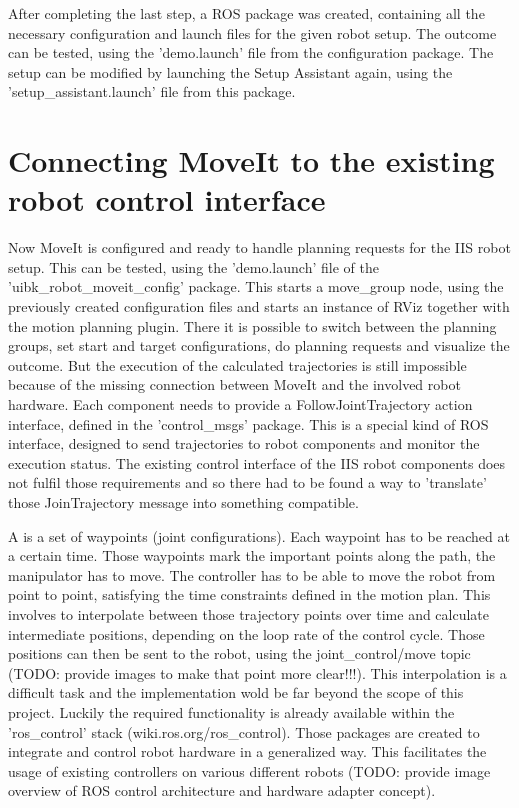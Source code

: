 After completing the last step, a ROS package was created, containing all the necessary configuration and launch files for the given robot setup. The outcome can be tested, using the 'demo.launch' file from the configuration package. The setup can be modified by launching the Setup Assistant again, using the 'setup\_assistant.launch' file from this package.


\section{Connecting MoveIt to the existing robot control interface}

Now MoveIt is configured and ready to handle planning requests for the IIS robot setup. This can be tested, using the 'demo.launch' file of the 'uibk\_robot\_moveit\_config' package. This starts a move\_group node, using the previously created configuration files and starts an instance of RViz together with the motion planning plugin. There it is possible to switch between the planning groups, set start and target configurations, do planning requests and visualize the outcome. But the execution of the calculated trajectories is still impossible because of the missing connection between MoveIt and the involved robot hardware. Each component needs to provide a FollowJointTrajectory action interface, defined in the 'control\_msgs' package. This is a special kind of ROS interface, designed to send trajectories to robot components and monitor the execution status. The existing control interface of the IIS robot components does not fulfil those requirements and so there had to be found a way to 'translate' those JoinTrajectory message into something compatible.

A is a set of waypoints (joint configurations). Each waypoint has to be reached at a certain time.
Those waypoints mark the important points along the path, the manipulator has to move. The controller has to be able to move the robot from point to point, satisfying the time constraints defined in the motion plan. This involves to interpolate between those trajectory points over time and calculate intermediate positions, depending on the loop rate of the control cycle. Those positions can then be sent to the robot, using the joint\_control/move topic (TODO: provide images to make that point more clear!!!). This interpolation is a difficult task and the implementation wold be far beyond the scope of this project. Luckily the required functionality is already available within the 'ros\_control' stack (wiki.ros.org/ros\_control). Those packages are created to integrate and control robot hardware in a generalized way. This facilitates the usage of existing controllers on various different robots (TODO: provide image overview of ROS control architecture and hardware adapter concept).

